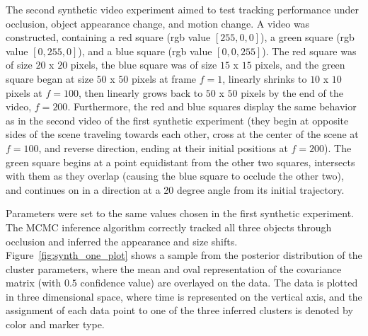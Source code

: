 \documentclass[twocolumn, final]{svjour3}
\begin{document}
The second synthetic video experiment aimed to test tracking performance under occlusion, object appearance change, and motion change. A video was constructed, containing a red square (rgb value $[255,0,0]$), a green square (rgb value $[0,255,0]$), and a blue square (rgb value $[0,0,255]$). The red square was of size $20$ x $20$ pixels, the blue square was of size $15$ x $15$ pixels, and the green square began at size $50$ x $50$ pixels at frame $f=1$, linearly shrinks to $10$ x $10$ pixels at $f=100$, then linearly grows back to $50$ x $50$ pixels by the end of the video, $f=200$. Furthermore, the red and blue squares display the same behavior as in the second video of the first synthetic experiment (they begin at opposite sides of the scene traveling towards each other, cross at the center of the scene at $f=100$, and reverse direction, ending at their initial positions at $f=200$). The green square begins at a point equidistant from the other two squares, intersects with them as they overlap (causing the blue square to occlude the other two), and continues on in a direction at a 20 degree angle from its initial trajectory.

Parameters were set to the same values chosen in the first synthetic experiment. The MCMC inference algorithm correctly tracked all three objects through occlusion and inferred the appearance and size shifts. Figure~\ref{fig:synth_one_plot} shows a sample from the posterior distribution of the cluster parameters, where the mean and oval representation of the covariance matrix (with $0.5$ confidence value) are overlayed on the data. The data is plotted in three dimensional space, where time is represented on the vertical axis, and the assignment of each data point to one of the three inferred clusters is denoted by color and marker type. 
\end{document}

